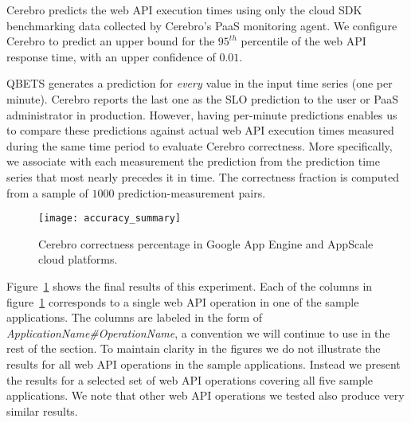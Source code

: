 Cerebro predicts the web API execution times using only the cloud SDK
benchmarking data collected by Cerebro's PaaS monitoring agent. 
We configure Cerebro to predict an
upper bound for the $95^{th}$ percentile of the web API response time, with an
upper confidence of $0.01$. 

QBETS generates a prediction for \textit{every} value in the input time series 
(one per minute).  Cerebro reports the last one as the SLO prediction to the
user or PaaS administrator in production.  However, having per-minute predictions 
enables us to compare these predictions against actual web API execution
times measured during the same time period to evaluate Cerebro correctness. 
More specifically, we
associate with each measurement the prediction from the prediction time series
that most nearly precedes it in time.  The correctness fraction is computed
from a sample of $1000$ prediction-measurement pairs.


\begin{figure}
\centering
\texttt{[image: accuracy\_summary]}
\caption{Cerebro correctness percentage in Google App Engine and AppScale cloud platforms.}
\label{fig:accuracy_summary}
\end{figure}

Figure~\ref{fig:accuracy_summary} shows the final results of this experiment.
Each of the columns in figure~\ref{fig:accuracy_summary} corresponds 
to a single web API operation in 
one of the sample applications. The columns are labeled in the 
form of \textit{ApplicationName\#OperationName}, a convention 
we will continue to use in the rest of the section. To maintain clarity in the figures we do not 
illustrate the results for all web API operations in the sample applications. Instead we present the results for a selected set of 
web API operations covering all five sample applications. We note that other web API operations we tested also produce
very similar results.

